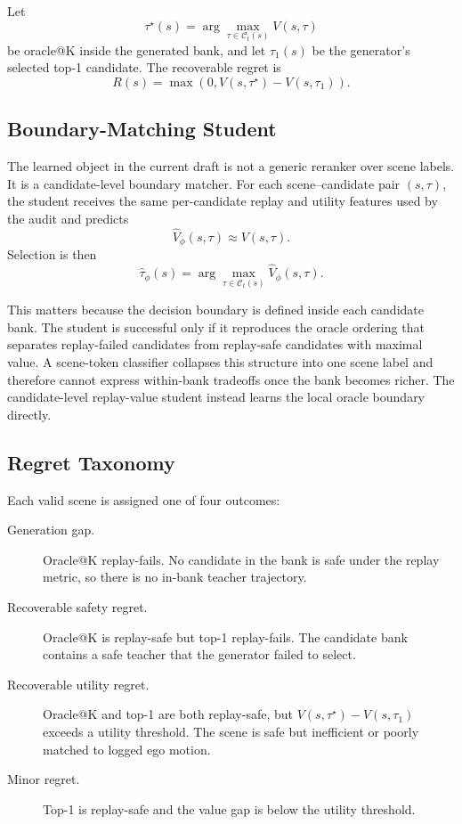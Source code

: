 \documentclass{article}
\begin{document}
Let
\[
  \tau^\star(s)=\arg\max_{\tau\in\mathcal{C}_t(s)} V(s,\tau)
\]
be oracle@K inside the generated bank, and let $\tau_1(s)$ be the generator's selected
top-1 candidate. The recoverable regret is
\begin{equation}
  R(s)=\max(0, V(s,\tau^\star)-V(s,\tau_1)).
\end{equation}

\subsection{Boundary-Matching Student}
\label{sec:method:student}

The learned object in the current draft is not a generic reranker over scene labels. It is
a candidate-level boundary matcher. For each scene--candidate pair $(s,\tau)$, the student
receives the same per-candidate replay and utility features used by the audit and predicts
\[
  \hat V_\phi(s,\tau) \approx V(s,\tau).
\]
Selection is then
\[
  \hat \tau_\phi(s)=\arg\max_{\tau\in\mathcal{C}_t(s)} \hat V_\phi(s,\tau).
\]

This matters because the decision boundary is defined inside each candidate bank. The
student is successful only if it reproduces the oracle ordering that separates
replay-failed candidates from replay-safe candidates with maximal value. A scene-token
classifier collapses this structure into one scene label and therefore cannot express
within-bank tradeoffs once the bank becomes richer. The candidate-level replay-value
student instead learns the local oracle boundary directly.

\subsection{Regret Taxonomy}
\label{sec:method:taxonomy}

Each valid scene is assigned one of four outcomes:

\begin{description}
  \item[Generation gap.] Oracle@K replay-fails. No candidate in the bank is safe under the
    replay metric, so there is no in-bank teacher trajectory.
  \item[Recoverable safety regret.] Oracle@K is replay-safe but top-1 replay-fails. The
    candidate bank contains a safe teacher that the generator failed to select.
  \item[Recoverable utility regret.] Oracle@K and top-1 are both replay-safe, but
    $V(s,\tau^\star)-V(s,\tau_1)$ exceeds a utility threshold. The scene is safe but
    inefficient or poorly matched to logged ego motion.
  \item[Minor regret.] Top-1 is replay-safe and the value gap is below the utility
    threshold.
\end{description}
\end{document}
